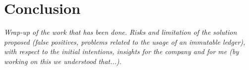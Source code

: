 \chapter{Conclusion}
\label{cha:conclusion}
\textit{Wrap-up of the work that has been done. Risks and limitation of the solution proposed (false positives, problems related to the usage of an immutable ledger), with respect to the initial intentions, insights for the company and for me (by working on this we understood that...).}

